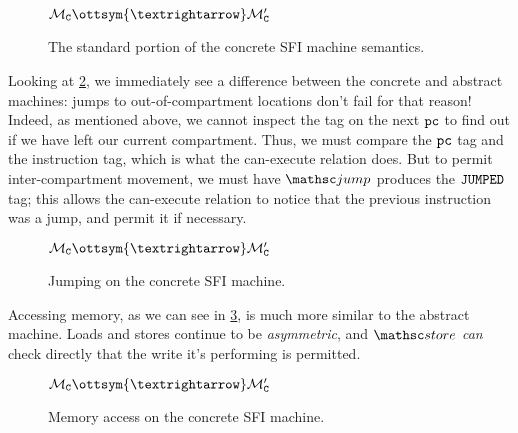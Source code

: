 \documentclass[12pt]{amsart}
\begin{document}
\begin{figure}
  \begin{ottdefnblock}{$\mathcal{M}_{\concrete{C}} \ottsym{→} \mathcal{M}_{\concrete{C}}'$}
                      {}
    \ottusedrule{\ottdrulecstepXXnop{}}\medskip
    \ottusedrule{\ottdrulecstepXXconst{}}\medskip
    \ottusedrule{\ottdrulecstepXXmov{}}\medskip
    \ottusedrule{\ottdrulecstepXXbinop{}}\medskip
    \ottusedrule{\ottdrulecstepXXbnzXXzero{}}\medskip
    \ottusedrule{\ottdrulecstepXXbnzXXnonzero{}}
  \end{ottdefnblock}\vspace{-\baselineskip}
  \caption{The standard portion of the concrete SFI machine semantics.}
  \label{fig:sfi-concrete-step-simple}
\end{figure}

Looking at \cref{fig:sfi-concrete-step-jump}, we immediately see a difference
between the concrete and abstract machines: jumps to out-of-compartment
locations don't fail for that reason!  Indeed, as mentioned above, we cannot
inspect the tag on the next $\mathtt{pc}$ to find out if we have left our current
compartment.  Thus, we must compare the $\mathtt{pc}$ tag and the instruction tag,
which is what the can-execute relation does.  But to permit inter-compartment
movement, we must have $\opcode{jump}$ produces the $\mathtt{JUMPED}$ tag; this allows
the can-execute relation to notice that the previous instruction was a jump, and
permit it if necessary.

\begin{figure}
  \begin{ottdefnblock}{$\mathcal{M}_{\concrete{C}} \ottsym{→} \mathcal{M}_{\concrete{C}}'$}
                      {}
    \ottusedrule{\ottdrulecstepXXjump{}}
  \end{ottdefnblock}\vspace{-\baselineskip}
  \caption{Jumping on the concrete SFI machine.}
  \label{fig:sfi-concrete-step-jump}
\end{figure}

Accessing memory, as we can see in \cref{fig:sfi-concrete-step-memory}, is much
more similar to the abstract machine.  Loads and stores continue to be
\emph{asymmetric}, and $\opcode{store}$ \emph{can} check directly that the write
it's performing is permitted.

\begin{figure}
  \begin{ottdefnblock}{$\mathcal{M}_{\concrete{C}} \ottsym{→} \mathcal{M}_{\concrete{C}}'$}
                      {}
    \ottusedrule{\ottdrulecstepXXload{}}\medskip
    \ottusedrule{\ottdrulecstepXXstore{}}
  \end{ottdefnblock}\vspace{-\baselineskip}
  \caption{Memory access on the concrete SFI machine.}
  \label{fig:sfi-concrete-step-memory}
\end{figure}
\end{document}
